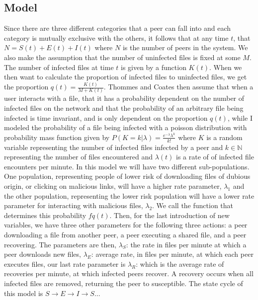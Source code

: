 \documentclass[12pt, oneside]{article}
\begin{document}
    \subsection{Model}
        Since there are three different categories that a peer can fall into and each category is mutually exclusive with the others,
        it follows that at any time $t$, that  $N=S(t)+E(t)+I(t)$ where  $N$ is the number of peers in the system. We also make the assumption that the number of uninfected files is fixed at some $M$.
        The number of infected files at time  $t$ is given by a function  $K(t)$. When we then want to calculate the proportion of infected
        files to uninfected files, we get the proportion  $q(t)=\frac{K(t)}{M+K(t)}$. Thommes and Coates then assume that when a user interacts with a file,
        that it has a probability dependent on the number of infected files on the network and that the probability of an arbitrary file being infected is 
        time invariant, and is only dependent on the proportion $q(t)$, while I modeled the probability of a file being infected with a poisson distribution with
        probability mass function given by $P(K=k | \lambda) = \frac{e^{-\lambda}\lambda^k}{k!}$ where $K$ is a random variable representing the number of infected files
        infected by a peer and $k\in\mathbb{N}$ representing the number of files encountered and $\lambda(t)$ is a rate of of infected file encounters per minute. In this model we will
        have two different sub-populations. One population, representing people of lower risk of downloading files of dubious origin, or clicking on malicious links, will have a higher rate parameter,
        $\lambda_1$ and the other population, representing the lower risk population will have a lower rate parameter for interacting with malicious files, $\lambda_2$.
        We call the function that determines this probability  $f{q(t)}$. Then, for the last introduction of new variables, we have three
        other parameters for the following three actions: a peer downloading a file from another peer, a peer executing a shared file, 
        and a peer recovering. The parameters are then,  $\lambda_S$:  the rate in files per minute at which a peer downloads new files, 
        $\lambda_E$: average rate, in files per minute, at which each peer executes files, our last rate parameter is  $\lambda_R$:
        which is the average rate of recoveries per minute, at which infected peers recover. A recovery occurs when all infected files are
        removed, returning the peer to susceptible. The state cycle of this model is  $S\to E\to I \to S\ldots$\newline
\end{document}
